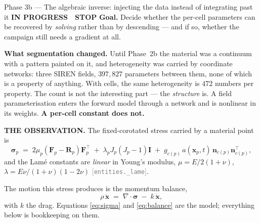 \documentclass[11pt,a4paper]{article}
\newcommand{\code}[1]{\texttt{#1}}
\newcommand{\Mat}[1]{\mathbf{#1}}
\newcommand{\src}[1]{{\footnotesize\textcolor{grey}{[#1]}}}
\newcommand{\prog}{\textcolor{warn}{\textbf{IN PROGRESS}}}
\newcommand{\stopp}{\textcolor{bad!30!white}{\textbf{STOP}}}
\begin{document}
\begin{phasebox}{Phase 3b --- The algebraic inverse: injecting the data instead of integrating past it \hfill \prog\ \ \stopp}
\textbf{Goal.} Decide whether the per-cell parameters can be recovered by \emph{solving} rather
than by descending --- and if so, whether the campaign still needs a gradient at all.

\textbf{What segmentation changed.} Until Phase~2b the material was a continuum with a pattern
painted on it, and heterogeneity was carried by coordinate networks: three SIREN fields,
$397{,}827$ parameters between them, none of which is a property of anything. With cells, the same
heterogeneity is $472$ numbers per property. The count is not the interesting part --- the
\emph{structure} is. A field parameterisation enters the forward model through a network and is
nonlinear in its weights. \textbf{A per-cell constant does not.}

\medskip
\textbf{THE OBSERVATION.} The fixed-corotated stress carried by a material point is
\begin{equation}
\boldsymbol\sigma_p \;=\; 2\mu_p (\Mat F_p - \Mat R_p)\Mat F_p^{\!\top} \;+\; \lambda_p J_p (J_p-1)\Mat I
\;+\; g_{c(p)}\,a(\Mat x_p,t)\,\Mat n_{c(p)}\Mat n_{c(p)}^{\!\top},
\label{eq:sigma}
\end{equation}
and the Lam\'e constants are \emph{linear} in Young's modulus, $\mu = E/2(1+\nu)$,
$\lambda = E\nu/(1+\nu)(1-2\nu)$ \src{\code{entities.\_lame}}.

The motion this stress produces is the momentum balance,
\begin{equation}
\rho\,\ddot{\Mat x} \;=\; \nabla\!\cdot\!\boldsymbol\sigma \;-\; k\,\dot{\Mat x} ,
\label{eq:balance}
\end{equation}
with $k$ the drag. Equations \eqref{eq:sigma} and \eqref{eq:balance} are the model; everything
below is bookkeeping on them.


\end{phasebox}
\end{document}
